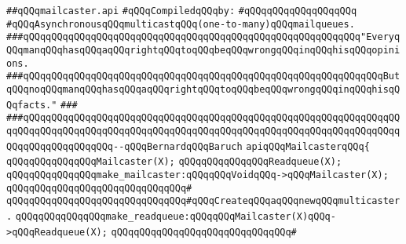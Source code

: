 \label{src/lib/src/lib/thread-kit/src/lib/mailcaster.api}
\verb|##qQQqmailcaster.api|\newline
\newline
\verb|#qQQqCompiledqQQqby:|\newline
\verb|#qQQqqQQqqQQqqQQqqQQq|\newline
\newline
\newline
\newline
\verb|#qQQqAsynchronousqQQqmulticastqQQq(one-to-many)qQQqmailqueues.|\newline
\newline
\newline
\newline
\verb|###qQQqqQQqqQQqqQQqqQQqqQQqqQQqqQQqqQQqqQQqqQQqqQQqqQQqqQQqqQQq"EveryqQQqmanqQQqhasqQQqaqQQqrightqQQqtoqQQqbeqQQqwrongqQQqinqQQqhisqQQqopinions.|\newline
\verb|###qQQqqQQqqQQqqQQqqQQqqQQqqQQqqQQqqQQqqQQqqQQqqQQqqQQqqQQqqQQqqQQqButqQQqnoqQQqmanqQQqhasqQQqaqQQqrightqQQqtoqQQqbeqQQqwrongqQQqinqQQqhisqQQqfacts."|\newline
\verb|###|\newline
\verb|###qQQqqQQqqQQqqQQqqQQqqQQqqQQqqQQqqQQqqQQqqQQqqQQqqQQqqQQqqQQqqQQqqQQqqQQqqQQqqQQqqQQqqQQqqQQqqQQqqQQqqQQqqQQqqQQqqQQqqQQqqQQqqQQqqQQqqQQqqQQqqQQqqQQqqQQqqQQq--qQQqBernardqQQqBaruch|\newline
\newline
\newline
\newline
\verb|apiqQQqMailcasterqQQq{|\newline
\newline
\verb|qQQqqQQqqQQqqQQqMailcaster(X);|\newline
\verb|qQQqqQQqqQQqqQQqReadqueue(X);|\newline
\newline
\verb|qQQqqQQqqQQqqQQqmake_mailcaster:qQQqqQQqVoidqQQq->qQQqMailcaster(X);|\newline
\verb|qQQqqQQqqQQqqQQqqQQqqQQqqQQqqQQq#|\newline
\verb|qQQqqQQqqQQqqQQqqQQqqQQqqQQqqQQq#qQQqCreateqQQqaqQQqnewqQQqmulticaster.|\newline
\newline
\verb|qQQqqQQqqQQqqQQqmake_readqueue:qQQqqQQqMailcaster(X)qQQq->qQQqReadqueue(X);|\newline
\verb|qQQqqQQqqQQqqQQqqQQqqQQqqQQqqQQq#|\newline
